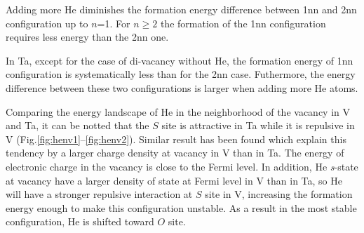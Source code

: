 \documentclass[a4,12pt,showpacs,preprintnumbers,amsmath,amssymb]{revtex4}
\begin{document}
Adding more He diminishes the formation energy difference between 1nn and 2nn configuration up to $n$=1. 
For $n \ge 2$ the formation of the 1nn configuration requires less energy than the 2nn one.

In Ta, except for the case of di-vacancy without He, the formation energy of 1nn configuration is 
systematically less than for the 2nn case. Futhermore, the energy difference between these two configurations is larger 
when adding more He atoms.

Comparing the energy landscape of He in the neighborhood of the vacancy in V and Ta, it can be notted that 
the $S$ site is attractive in Ta while it is repulsive in V (Fig.\ref{fig:henv1}--\ref{fig:henv2}). 
Similar result has been found \cite{seletskaia2008} which explain this tendency by a larger charge density at vacancy 
in V than in Ta. The energy of electronic charge in the vacancy is close to the Fermi level. 
In addition, He \textit{s}-state at vacancy have a larger density of state at Fermi level in V than in Ta, so He will have 
a stronger repulsive interaction at $S$ site in V, 
increasing the formation energy enough to make this configuration unstable. 
As a result in the most stable configuration, He is shifted toward $O$ site.
\end{document}
